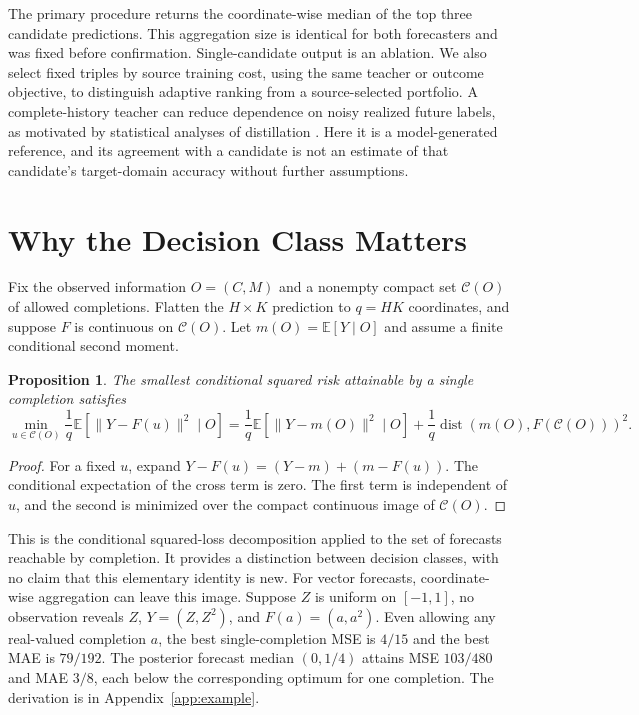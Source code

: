 \documentclass{article}
\newtheorem{proposition}{Proposition}
\newcommand{\E}{\mathbb{E}}
\begin{document}
The primary procedure returns the coordinate-wise median of the top three candidate predictions. This aggregation size is identical for both forecasters and was fixed before confirmation. Single-candidate output is an ablation. We also select fixed triples by source training cost, using the same teacher or outcome objective, to distinguish adaptive ranking from a source-selected portfolio. A complete-history teacher can reduce dependence on noisy realized future labels, as motivated by statistical analyses of distillation \citep{menon2021statistical}. Here it is a model-generated reference, and its agreement with a candidate is not an estimate of that candidate's target-domain accuracy without further assumptions.

\section{Why the Decision Class Matters}

Fix the observed information $O=(C,M)$ and a nonempty compact set $\mathcal C(O)$ of allowed completions. Flatten the $H\times K$ prediction to $q=HK$ coordinates, and suppose $F$ is continuous on $\mathcal C(O)$. Let $m(O)=\E[Y\mid O]$ and assume a finite conditional second moment.

\begin{proposition}
The smallest conditional squared risk attainable by a single completion satisfies
\begin{equation}
 \min_{u\in\mathcal C(O)}\frac1q\E[\|Y-F(u)\|^2\mid O]
 =\frac1q\E[\|Y-m(O)\|^2\mid O]
 +\frac1q\operatorname{dist}(m(O),F(\mathcal C(O)))^2.
 \label{eq:image}
\end{equation}
\end{proposition}
\begin{proof}
For a fixed $u$, expand $Y-F(u)=(Y-m)+(m-F(u))$. The conditional expectation of the cross term is zero. The first term is independent of $u$, and the second is minimized over the compact continuous image of $\mathcal C(O)$.
\end{proof}

This is the conditional squared-loss decomposition applied to the set of forecasts reachable by completion. It provides a distinction between decision classes, with no claim that this elementary identity is new. For vector forecasts, coordinate-wise aggregation can leave this image. Suppose $Z$ is uniform on $[-1,1]$, no observation reveals $Z$, $Y=(Z,Z^2)$, and $F(a)=(a,a^2)$. Even allowing any real-valued completion $a$, the best single-completion MSE is $4/15$ and the best MAE is $79/192$. The posterior forecast median $(0,1/4)$ attains MSE $103/480$ and MAE $3/8$, each below the corresponding optimum for one completion. The derivation is in Appendix~\ref{app:example}.
\end{document}
